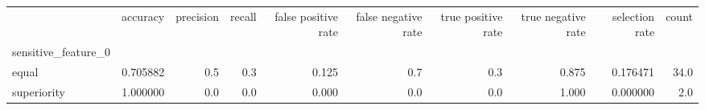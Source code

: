 \begin{tabular}{lrrrrrrrrr}
\toprule
{} &  accuracy &  precision &  recall &  false positive rate &  false negative rate &  true positive rate &  true negative rate &  selection rate &  count \\
sensitive\_feature\_0 &           &            &         &                      &                      &                     &                     &                 &        \\
\midrule
equal               &  0.705882 &        0.5 &     0.3 &                0.125 &                  0.7 &                 0.3 &               0.875 &        0.176471 &   34.0 \\
superiority         &  1.000000 &        0.0 &     0.0 &                0.000 &                  0.0 &                 0.0 &               1.000 &        0.000000 &    2.0 \\
\bottomrule
\end{tabular}
